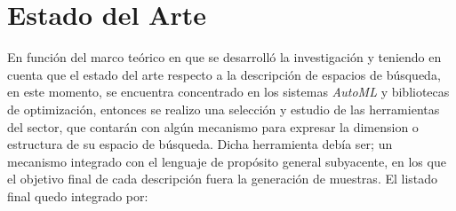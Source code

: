 \section{Estado del Arte}

En función del marco teórico en que se desarrolló la investigación y teniendo en cuenta
que el estado del arte respecto a la descripción de espacios de búsqueda, en este momento,
se encuentra concentrado en los sistemas {\it AutoML} y bibliotecas de optimización, entonces
se realizo una selección y estudio de las herramientas del sector, que contarán con algún
mecanismo para expresar la dimension o estructura de su espacio de búsqueda. Dicha
herramienta debía ser; un mecanismo integrado con el lenguaje de propósito general
subyacente, en los que el objetivo final de cada descripción fuera la generación de
muestras. El listado final quedo integrado por:

